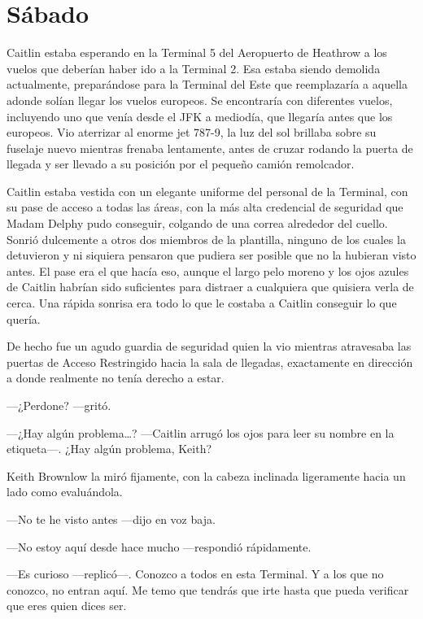 \chapter*{Sábado}

Caitlin estaba esperando en la Terminal 5 del Aeropuerto de Heathrow a
los vuelos que deberían haber ido a la Terminal 2. Esa estaba siendo
demolida actualmente, preparándose para la Terminal del Este que
reemplazaría a aquella adonde solían llegar los vuelos europeos. Se
encontraría con diferentes vuelos, incluyendo uno que venía desde el JFK
a mediodía, que llegaría antes que los europeos. Vio aterrizar al enorme
jet 787-9, la luz del sol brillaba sobre su fuselaje nuevo mientras
frenaba lentamente, antes de cruzar rodando la puerta de llegada y ser
llevado a su posición por el pequeño camión remolcador.

Caitlin estaba vestida con un elegante uniforme del personal de la
Terminal, con su pase de acceso a todas las áreas, con la más alta
credencial de seguridad que Madam Delphy pudo conseguir, colgando de una
correa alrededor del cuello. Sonrió dulcemente a otros dos miembros
de la plantilla, ninguno de los cuales la detuvieron y ni siquiera
pensaron que pudiera ser posible que no la hubieran visto antes. El pase
era el que hacía eso, aunque el largo pelo moreno y los ojos azules de
Caitlin habrían sido suficientes para distraer a cualquiera que quisiera
verla de cerca. Una rápida sonrisa era todo lo que le costaba a Caitlin
conseguir lo que quería.

De hecho fue un agudo guardia de seguridad quien la vio mientras
atravesaba las puertas de Acceso Restringido hacia la sala de llegadas,
exactamente en dirección a donde realmente no tenía derecho a estar.

---¿Perdone? ---gritó.

---¿Hay algún problema\ldots{}? ---Caitlin arrugó los ojos para
leer su nombre en la etiqueta---. ¿Hay algún problema, Keith?

Keith Brownlow la miró fijamente, con la cabeza inclinada
ligeramente hacia un lado como evaluándola.

---No te he visto antes ---dijo en voz baja.

---No estoy aquí desde hace mucho ---respondió rápidamente.

---Es curioso ---replicó---. Conozco a todos en esta Terminal. Y
a los que no conozco, no entran aquí. Me temo que tendrás que irte hasta
que pueda verificar que eres quien dices ser.


